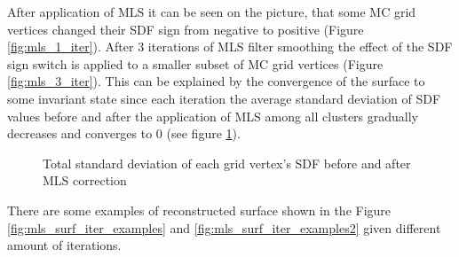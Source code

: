 After application of MLS it can be seen on the picture, that some MC grid vertices changed their SDF sign from negative to positive (Figure \ref{fig:mls_1_iter}). After 3 iterations of MLS filter smoothing the effect of the SDF sign switch is applied to a smaller subset of MC grid vertices (Figure \ref{fig:mls_3_iter}). This can be explained by the convergence of the surface to some invariant state since each iteration the average standard deviation of SDF values before and after the application of MLS among all clusters gradually decreases and converges to 0 (see figure \ref{fig:mls_std_dev}).
\begin{figure}[h]
	\begin{center}
	\end{center}
	\caption{Total standard deviation of each grid vertex's SDF before and after MLS correction}
	\label{fig:mls_std_dev}
\end{figure}
There are some examples of reconstructed surface shown in the Figure \ref{fig:mls_surf_iter_examples} and \ref{fig:mls_surf_iter_examples2} given different amount of iterations.
